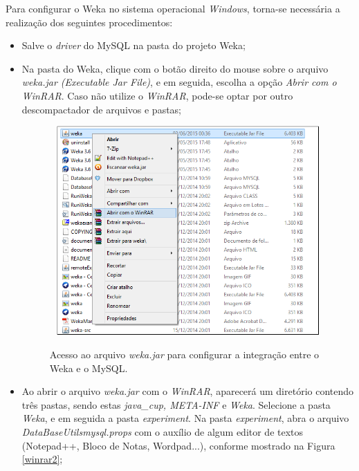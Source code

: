 Para configurar o Weka no sistema operacional \textit{Windows}, torna-se necessária a realização dos seguintes procedimentos:
\begin{itemize}
	\item Salve o \textit{driver} do MySQL na pasta do projeto Weka; 
	\item Na pasta do Weka, clique com o botão direito do mouse sobre o arquivo \textit{weka.jar (Executable Jar File)}, e em seguida, escolha a opção \textit{Abrir com o WinRAR}. Caso não utilize o \textit{WinRAR}, pode-se optar por outro descompactador de arquivos e pastas;
	
	 \begin{figure}[!h]
	 	\centering
	 	{\includegraphics[width=11cm, height=8cm]{images/winrar}}
	 	\caption {Acesso ao arquivo \textit{weka.jar} para configurar a integração entre o Weka e o MySQL.}
	 	\label{winrar}
	 \end{figure}
	 
	 \item Ao abrir o arquivo \textit{weka.jar} com o \textit{WinRAR}, aparecerá um diretório contendo três pastas, sendo estas \textit{java\_cup, META-INF} e \textit{Weka}. Selecione a pasta \textit{Weka}, e em seguida a pasta \textit{experiment}. Na pasta \textit{experiment}, abra o arquivo \textit{DataBaseUtilsmysql.props} com o auxílio de algum editor de textos (Notepad++, Bloco de Notas, Wordpad...), conforme mostrado na Figura \ref{winrar2};
	 

\end{itemize}

